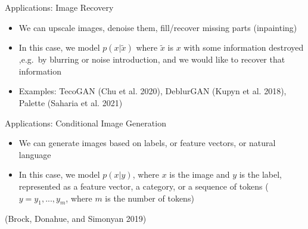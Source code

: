 \begin{frame}{Applications: Image Recovery}
\protect\hypertarget{applications-image-recovery}{}

\begin{itemize}
\tightlist
\item
  We can upscale images, denoise them, fill/recover missing parts
  (inpainting)
\item
  In this case, we model \(p(x|\tilde{x})\) where \(\tilde{x}\) is \(x\)
  with some information destroyed ,e.g.~by blurring or noise
  introduction, and we would like to recover that information
\item
  Examples: TecoGAN (Chu et al. 2020), DeblurGAN (Kupyn et al. 2018),
  Palette (Saharia et al. 2021)
\end{itemize}


\end{frame}

\begin{frame}{Applications: Conditional Image Generation}
\protect\hypertarget{applications-conditional-image-generation}{}

\begin{itemize}
\tightlist
\item
  We can generate images based on labels, or feature vectors, or natural
  language
\item
  In this case, we model \(p(x|y)\), where \(x\) is the image and \(y\)
  is the label, represented as a feature vector, a category, or a
  sequence of tokens (\(y=y_1,...,y_m\), where \(m\) is the number of
  tokens)
\end{itemize}


(Brock, Donahue, and Simonyan 2019)

\end{frame}

